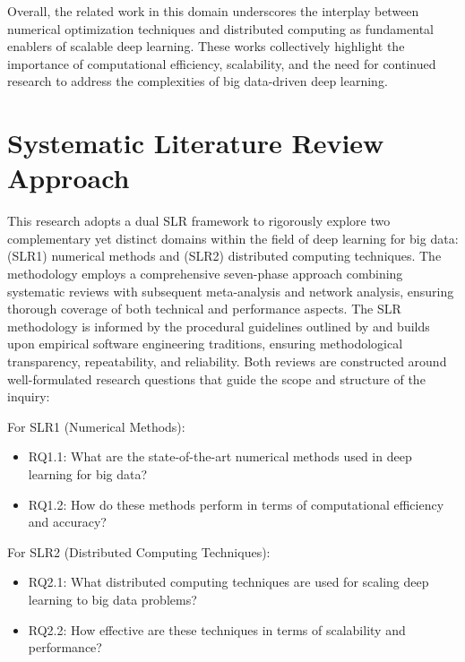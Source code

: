 \documentclass[acmsmall]{acmart}
\begin{document}
Overall, the related work in this domain underscores the interplay between numerical optimization techniques and distributed computing as fundamental enablers of scalable deep learning. These works collectively highlight the importance of computational efficiency, scalability, and the need for continued research to address the complexities of big data-driven deep learning.

\section{Systematic Literature Review Approach}\label{sec:systematic-literature-review-approach}
This research adopts a dual SLR framework to rigorously explore two complementary yet distinct domains within the field of deep learning for big data: (SLR1) numerical methods and (SLR2) distributed computing techniques. The methodology employs a comprehensive seven-phase approach combining systematic reviews with subsequent meta-analysis and network analysis, ensuring thorough coverage of both technical and performance aspects.
The SLR methodology is informed by the procedural guidelines outlined by \citet{kitchenham2004procedures} and builds upon empirical software engineering traditions, ensuring methodological transparency, repeatability, and reliability. Both reviews are constructed around well-formulated research questions that guide the scope and structure of the inquiry:

For SLR1 (Numerical Methods):
\begin{itemize}
    \item RQ1.1: What are the state-of-the-art numerical methods used in deep learning for big data?
    \item RQ1.2: How do these methods perform in terms of computational efficiency and accuracy?
\end{itemize}
For SLR2 (Distributed Computing Techniques):
\begin{itemize}
    \item RQ2.1: What distributed computing techniques are used for scaling deep learning to big data problems?
    \item RQ2.2: How effective are these techniques in terms of scalability and performance?
\end{itemize}
\end{document}
